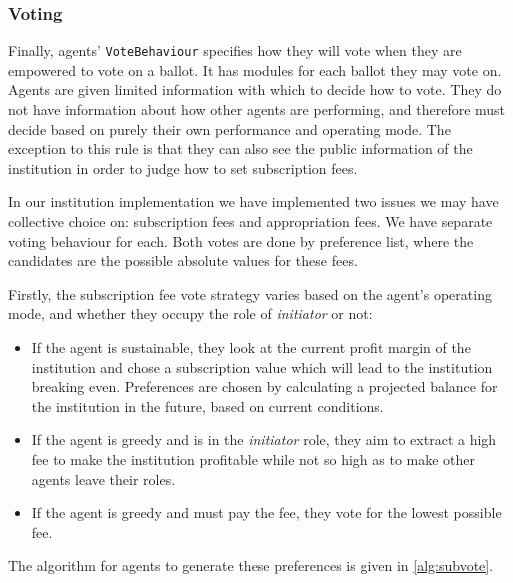 \subsubsection*{Voting}

Finally, agents' \texttt{VoteBehaviour} specifies how they will vote when they
are empowered to vote on a ballot. It has modules for each ballot they may
vote on. Agents are given limited information with which to decide how to
vote. They do not have information about how other agents are performing, and
therefore must decide based on purely their own performance and operating mode. The exception to
this rule is that they can also see the public information of the institution
in order to judge how to set subscription fees. 

In our institution implementation we have implemented two issues we may have collective
choice on: subscription fees and appropriation fees. We have separate voting
behaviour for each. Both votes are done by preference list, where the
candidates are the possible absolute values for these fees.

Firstly, the subscription fee vote strategy varies based on the agent's
operating mode, and whether they occupy the role of \emph{initiator} or not:

\begin{itemize}
\item If the agent is sustainable, they look at the current profit margin of the institution and chose a subscription value which will lead to the institution breaking even. Preferences are chosen by calculating a projected balance for the institution in the future, based on current conditions.
\item If the agent is greedy and is in the \emph{initiator} role, they aim to extract a high fee to make the institution profitable while not so high as to make other agents leave their roles.
\item If the agent is greedy and must pay the fee, they vote for the lowest possible fee.
\end{itemize}

The algorithm for agents to generate these preferences is given in \autoref{alg:subvote}.


